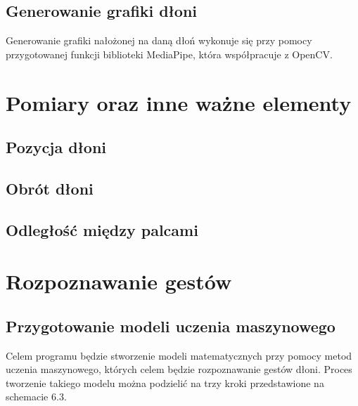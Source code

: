 \subsection{Generowanie grafiki dłoni}

\quad Generowanie grafiki nałożonej na daną dłoń wykonuje się przy pomocy przygotowanej funkcji biblioteki MediaPipe, która współpracuje z OpenCV.   

\section{Pomiary oraz inne ważne elementy}

\subsection{Pozycja dłoni}

\subsection{Obrót dłoni}

\subsection{Odległość między palcami}




\section{Rozpoznawanie gestów}

\subsection{Przygotowanie modeli uczenia maszynowego}
\quad Celem programu będzie stworzenie modeli matematycznych przy pomocy metod uczenia maszynowego, których celem będzie rozpoznawanie gestów dłoni. Proces tworzenie takiego modelu można podzielić na trzy kroki przedstawione na schemacie 6.3. 

